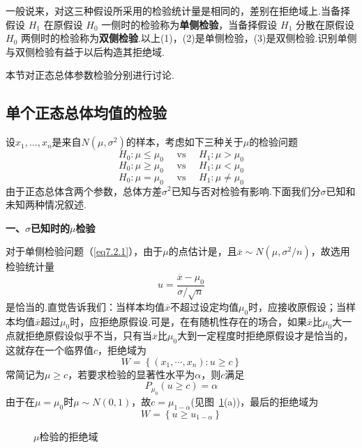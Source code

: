 一般说来，对这三种假设所采用的检验统计量是相同的，差别在拒绝域上.当备择假设 $H_{1}$ 在原假设 $H_{0}$ 一侧时的检验称为\textbf{单侧检验}，当备择假设 $H_{1}$ 分散在原假设 $H_{0}$ 两侧时的检验称为\textbf{双侧检验}.以上(1)，(2)是单侧检验，(3)是双侧检验.识别单侧与双侧检验有益于以后构造其拒绝域.

本节对正态总体参数检验分别进行讨论.
\subsection{单个正态总体均值的检验\label{7.2.1}}
设$x _ { 1 } , \dotsc , x _ { n }$是来自$N(\mu ,\sigma^{2})$的样本，考虑如下三种关于$\mu $的检验问题
\begin{equation}\label{eq7.2.1}
H _ { 0 } : \mu \leq \mu _ { 0 } \quad \text { vs } \quad H _ { 1 } : \mu > \mu _ { 0 }
\end{equation}
\begin{equation}\label{eq7.2.2}
H _ { 0 } : \mu \geq \mu _ { 0 } \quad \text { vs } \quad H _ { 1 } : \mu < \mu _ { 0 }
\end{equation}
\begin{equation}\label{eq7.2.3}
H _ { 0 } : \mu = \mu _ { 0 } \quad \text { vs } \quad H _ { 1 } : \mu \neq \mu _ { 0 }
\end{equation}
由于正态总体含两个参数，总体方差$\sigma^{2}$已知与否对检验有影响.下面我们分$\sigma$已知和未知两种情况叙述.

\textbf{一、$\sigma$已知时的$\mu$检验}

对于单侧检验问题（\ref{eq7.2.1}），由于$\mu $的点估计是，且$\overline { x } \sim N \left( \mu , \sigma ^ { 2 } / n \right)$，故选用检验统计量
\begin{equation}\label{eq7.2.4}
u = \frac { \overline { x } - \mu _ { 0 } } { \sigma / \sqrt { n } }
\end{equation}
是恰当的.直觉告诉我们：当样本均值$\overline{x}$不超过设定均值$\mu_{ 0 }$时，应接收原假设；当样本均值$\overline{x}$超过$\mu_{ 0 }$时，应拒绝原假设.可是，在有随机性存在的场合，如果$\overline{x}$比$\mu_{ 0 }$大一点就拒绝原假设似乎不当，只有当$\overline{x}$比$\mu_{ 0 }$大到一定程度时拒绝原假设才是恰当的，这就存在一个临界值$c$，拒绝域为
\begin{equation}\label{eq7.2.5}
W = \left\{ \left( x _ { 1 } , \cdots , x _ { n } \right) : u \geq c \right\}
\end{equation}
常简记为${\mu \geq c}$，若要求检验的显著性水平为$\alpha$，则$c$满足
\[P _ { \mu _ { 0 } } ( u \geq c ) = \alpha\]
由于在$\mu =\mu_{0}$时$\mu \sim N(0,1)$，故$c=\mu _{1-\alpha}$(见图~\ref{fig7.2.1}(a))，最后的拒绝域为
\begin{equation}\label{eq7.2.6}
W = \left\lbrace  u \geq u _ { 1 - \alpha }\right\rbrace 
\end{equation}
\begin{figure}[htbp]
	\centering
	\caption{$\mu $检验的拒绝域}\label{fig7.2.1}
\end{figure}

